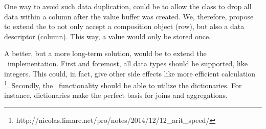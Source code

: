 One way to avoid such data duplication, could be to allow the  class to drop all data within a column after the value buffer was created. We, therefore, propose to extend the  to not only accept a composition object (row), but also a data descriptor (column). This way, a value would only be stored once.

A better, but a more long-term solution, would be to extend the \bd~implementation. First and foremost, all data types should be supported, like integers. This could, in fact, give other side effects like more efficient calculation \footnote{http://nicolas.limare.net/pro/notes/2014/12/12\_arit\_speed/}. Secondly, the \bd~functionality should be able to utilize the dictionaries. For instance, dictionaries make the perfect basis for joins and aggregations. 
